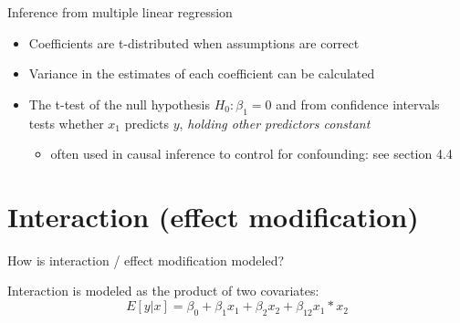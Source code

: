 \documentclass[
  ignorenonframetext,
]{beamer}
\providecommand{\tightlist}{%
  \setlength{\itemsep}{0pt}\setlength{\parskip}{0pt}}
\begin{document}
\begin{frame}{Inference from multiple linear regression}
\protect\hypertarget{inference-from-multiple-linear-regression}{}

\begin{itemize}
\tightlist
\item
  Coefficients are t-distributed when assumptions are correct
\item
  Variance in the estimates of each coefficient can be calculated
\item
  The t-test of the null hypothesis \(H_0: \beta_1 = 0\) and from
  confidence intervals tests whether \(x_1\) predicts \(y\),
  \emph{holding other predictors constant}

  \begin{itemize}
  \tightlist
  \item
    often used in causal inference to control for confounding: see
    section 4.4
  \end{itemize}
\end{itemize}

\end{frame}

\hypertarget{interaction-effect-modification}{%
\section{Interaction (effect
modification)}\label{interaction-effect-modification}}

\begin{frame}{How is interaction / effect modification modeled?}
\protect\hypertarget{how-is-interaction-effect-modification-modeled}{}

Interaction is modeled as the product of two covariates: \[
E[y|x] = \beta_0 + \beta_1 x_1 + \beta_2 x_2 + \beta_{12} x_1*x_2
\]

\end{frame}
\end{document}
